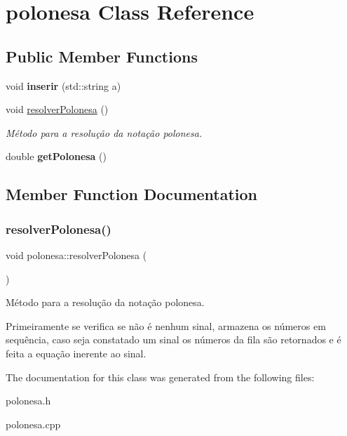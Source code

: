 \hypertarget{classpolonesa}{}\section{polonesa Class Reference}
\label{classpolonesa}
\subsection*{Public Member Functions}
\begin{DoxyCompactItemize}
\item 
\mbox{\label{classpolonesa_a2d81f2ebdd9560aef32adf17453f2382}} 
void {\bfseries inserir} (std\+::string a)
\item 
void \mbox{\hyperlink{classpolonesa_a6c083c41b2d61c229b7918efe89dcacc}{resolver\+Polonesa}} ()
\begin{DoxyCompactList}\small\item\em Método para a resolução da notação polonesa. \end{DoxyCompactList}\item 
\mbox{\label{classpolonesa_a55a4e916d4cf4e018073e79dbc50de35}} 
double {\bfseries get\+Polonesa} ()
\end{DoxyCompactItemize}


\subsection{Member Function Documentation}
\mbox{\label{classpolonesa_a6c083c41b2d61c229b7918efe89dcacc}} 
\subsubsection{\texorpdfstring{resolver\+Polonesa()}{resolverPolonesa()}}
{\footnotesize\ttfamily void polonesa\+::resolver\+Polonesa (\begin{DoxyParamCaption}{ }\end{DoxyParamCaption})}



Método para a resolução da notação polonesa. 

Primeiramente se verifica se não é nenhum sinal, armazena os números em sequência, caso seja constatado um sinal os números da fila são retornados e é feita a equação inerente ao sinal.

The documentation for this class was generated from the following files\+:\begin{DoxyCompactItemize}
\item 
polonesa.\+h\item 
polonesa.\+cpp\end{DoxyCompactItemize}
